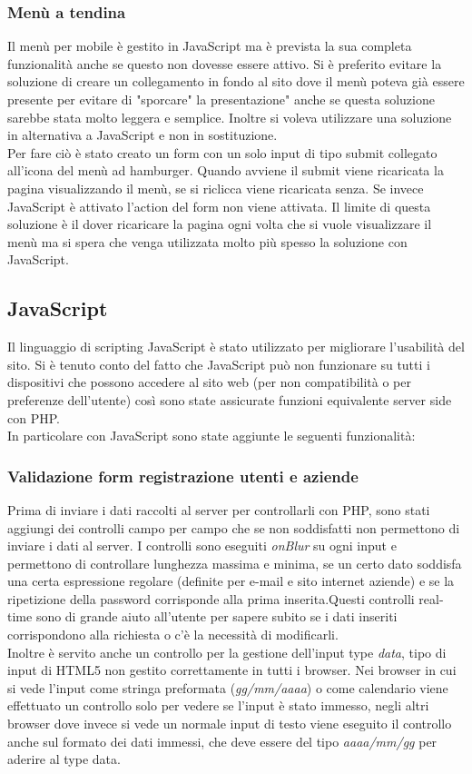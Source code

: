 		\subsubsection{Menù a tendina}
		Il menù per mobile è gestito in JavaScript ma è prevista la sua completa funzionalità anche se questo non dovesse essere attivo. Si è preferito evitare la soluzione di creare un collegamento in fondo al sito dove il menù poteva già essere presente per evitare di "sporcare" la presentazione" anche se questa soluzione sarebbe stata molto leggera e semplice. Inoltre si voleva utilizzare una soluzione in alternativa a JavaScript e non in sostituzione.\\
		Per fare ciò è stato creato un form con un solo input di tipo submit collegato all'icona del menù ad hamburger. Quando avviene il submit viene ricaricata la pagina visualizzando il menù, se si riclicca viene ricaricata senza. Se invece JavaScript è attivato l'action del form non viene attivata.
		Il limite di questa soluzione è il dover ricaricare la pagina ogni volta che si vuole visualizzare il menù ma si spera che venga utilizzata molto più spesso la soluzione con JavaScript.
	 
	\subsection{JavaScript}
	 Il linguaggio di scripting JavaScript è stato utilizzato per migliorare l'usabilità del sito. Si è tenuto conto del fatto che JavaScript può non funzionare su tutti i dispositivi che possono accedere al sito web (per non compatibilità o per preferenze dell'utente) così sono state assicurate funzioni equivalente server side con PHP.\\
	 In particolare con JavaScript sono state aggiunte le seguenti funzionalità:
	 
		\subsubsection{Validazione form registrazione utenti e aziende}
		Prima di inviare i dati raccolti al server per controllarli con PHP, sono stati aggiungi dei controlli campo per campo che se non soddisfatti non permettono di inviare i dati al server.
		I controlli sono eseguiti \emph{onBlur} su ogni input e permettono di controllare lunghezza massima e minima, se un certo dato soddisfa una certa espressione regolare (definite per e-mail e sito internet aziende) e se la ripetizione della password corrisponde alla prima inserita.Questi controlli real-time sono di grande aiuto all'utente per sapere subito se i dati inseriti corrispondono alla richiesta o c'è la necessità di modificarli.\\
		Inoltre è servito anche un controllo per la gestione dell'input type \emph{data}, tipo di input di HTML5 non gestito correttamente in tutti i browser. Nei browser in cui si vede l'input come stringa preformata (\emph{gg/mm/aaaa}) o come calendario viene effettuato un controllo solo per vedere se l'input è stato immesso, negli altri browser dove invece si vede un normale input di testo viene eseguito il controllo anche sul formato dei dati immessi, che deve essere del tipo \emph{aaaa/mm/gg} per aderire al type data.
		
